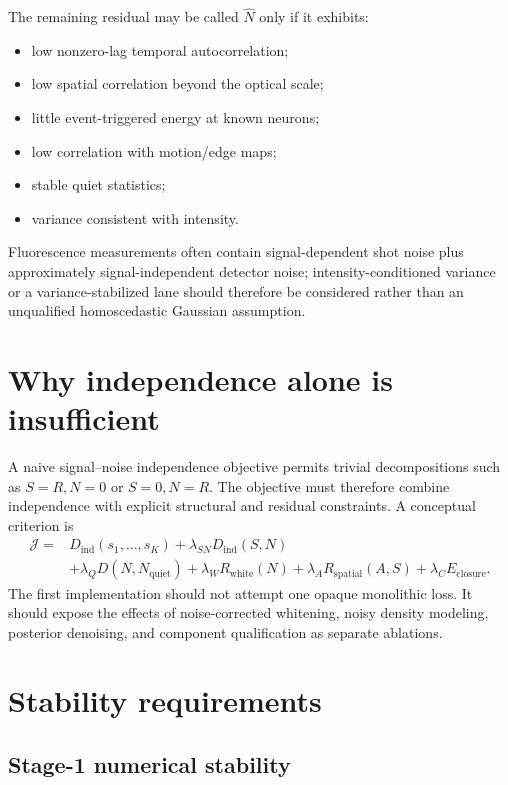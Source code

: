 \documentclass[11pt]{article}
\begin{document}
The remaining residual may be called $\widehat N$ only if it exhibits:
\begin{itemize}[leftmargin=*]
\item low nonzero-lag temporal autocorrelation;
\item low spatial correlation beyond the optical scale;
\item little event-triggered energy at known neurons;
\item low correlation with motion/edge maps;
\item stable quiet statistics;
\item variance consistent with intensity.
\end{itemize}
Fluorescence measurements often contain signal-dependent shot noise plus
approximately signal-independent detector noise; intensity-conditioned variance
or a variance-stabilized lane should therefore be considered rather than an
unqualified homoscedastic Gaussian assumption.

\section{Why independence alone is insufficient}

A naive signal--noise independence objective permits trivial decompositions such
as $S=R,N=0$ or $S=0,N=R$. The objective must therefore combine independence
with explicit structural and residual constraints. A conceptual criterion is
\begin{align}
\mathcal J
={}&
D_{\mathrm{ind}}(s_1,\ldots,s_K)
+
\lambda_{SN}D_{\mathrm{ind}}(S,N)
\nonumber\\
&+
\lambda_Q D(N,N_{\mathrm{quiet}})
+
\lambda_W R_{\mathrm{white}}(N)
+
\lambda_A R_{\mathrm{spatial}}(A,S)
+
\lambda_C E_{\mathrm{closure}}.
\end{align}
The first implementation should not attempt one opaque monolithic loss. It
should expose the effects of noise-corrected whitening, noisy density modeling,
posterior denoising, and component qualification as separate ablations.

\section{Stability requirements}

\subsection{Stage-1 numerical stability}
\end{document}
